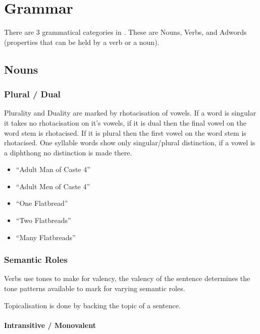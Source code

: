 \chapter{Grammar}

There are 3 grammatical categories in \langname{}. These are Nouns, Verbs, and Adwords (properties that can be held by a verb or a noun).

\section{Nouns}

\subsection{Plural / Dual}

Plurality and Duality are marked by rhotacisation of vowels. If a word is singular it takes no rhotacisation on it's vowels, if it is dual then the final vowel on the word stem is rhotacised. If it is plural then the first vowel on the word stem is rhotacised. One syllable words show only singular/plural distinction, if a vowel is a diphthong no distinction is made there.

\begin{itemize}[label={}]
    \item {} \broad{\xC\xE} ``Adult Man of Caste 4''
    \item {} \broad{\xC\eR} ``Adult Men of Caste 4''
    \item {}  ``One Flatbread''
    \item {}  ``Two Flatbreads''
    \item {}  ``Many Flatbreads''
\end{itemize}

\subsection{Semantic Roles}

Verbs use tones to make for valency, the valency of the sentence determines the tone patterns available to mark for varying semantic roles.

Topicalisation is done by backing the topic of a sentence.

\subsubsection{Intransitive / Monovalent}

